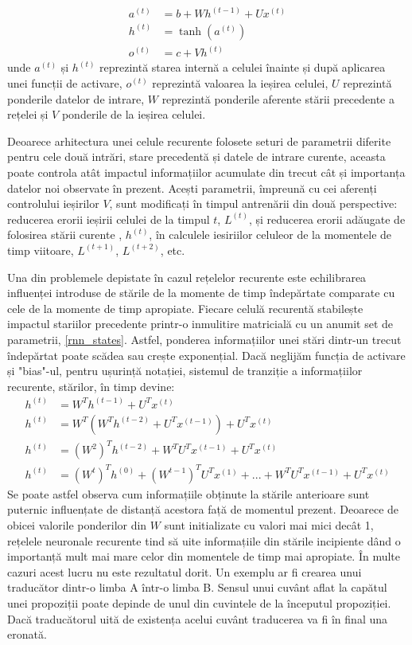 \documentclass[a4paper,12pt]{book}
\begin{document}
				\begin{align}
					a^{(t)} &= b + Wh^{(t-1)} + Ux^{(t)} \\ \label{rnn_states}
					h^{(t)} &= \tanh{(a^{(t)})}\\
					o^{(t)} &= c + Vh^{(t)}	
				\end{align}
				unde $a^{(t)}$ și $h^{(t)}$ reprezintă starea internă a celulei înainte și după aplicarea unei funcții de activare, $o^{(t)}$ reprezintă valoarea la ieșirea celulei, $U$ reprezintă ponderile datelor de intrare, $W$ reprezintă ponderile aferente stării precedente a rețelei și $V$ ponderile de la ieșirea celulei. \par
				
				Deoarece arhitectura unei celule recurente folosete seturi de parametrii diferite pentru cele două intrări, stare precedentă și datele de intrare curente, aceasta poate controla atât impactul informațiilor acumulate din trecut cât și importanța datelor noi observate în prezent. Acești parametrii, împreună cu cei aferenți controlului ieșirilor $V$,  sunt modificați în timpul antrenării din două perspective: reducerea erorii ieșirii celulei de la timpul $t$, $L^{(t)}$,  și reducerea erorii adăugate de folosirea stării curente , $h^{(t)}$, în calculele iesiriilor celuleor de la momentele de timp viitoare, $L^{(t+1)}$, $L^{(t+2)}$, etc. \par
				
				Una din problemele depistate în cazul rețelelor recurente este echilibrarea influenței introduse de stările de la momente de timp îndepărtate comparate cu cele de la momente de timp apropiate. Fiecare celulă recurentă stabilește impactul stariilor precedente printr-o inmulitire matricială cu un anumit set de parametrii, \ref{rnn_states}. Astfel, ponderea informațiilor unei stări dintr-un trecut îndepărtat poate scădea sau crește exponențial. Dacă neglijăm funcția de activare și "bias"-ul, pentru ușurință notației, sistemul de tranziție a informațiilor recurente, stărilor, în timp devine:
				\begin{align*}
				h^{(t)} &=  W^Th^{(t-1)} + U^Tx^{(t)}\\				
				h^{(t)} &=  W^T(W^Th^{(t-2)} + U^Tx^{(t-1)}) + U^Tx^{(t)}\\	
				h^{(t)} &= (W^2)^Th^{(t-2)} + W^TU^Tx^{(t-1)} + U^Tx^{(t)}\\	
				h^{(t)} &= (W^t)^Th^{(0)} + (W^{t-1})^TU^Tx^{(1)}+ ...+ W^TU^Tx^{(t-1)} + U^Tx^{(t)}
				\end{align*}
				Se poate astfel observa cum informațiile obținute la stările anterioare sunt puternic influențate de distanță acestora față de momentul prezent. Deoarece de obicei valorile ponderilor din $W$ sunt initializate cu valori mai mici decât 1, rețelele neuronale recurente tind să uite informațiile din stările incipiente dând o importanță mult mai mare celor din momentele de timp mai apropiate. În multe cazuri acest lucru nu este rezultatul dorit. Un exemplu ar fi crearea unui traducător dintr-o limba A într-o limba B. Sensul unui cuvânt aflat la capătul unei propoziții poate depinde de unul din cuvintele de la începutul propoziției. Dacă traducătorul uită de existența acelui cuvânt traducerea va fi în final una eronată.\par
				
\end{document}
